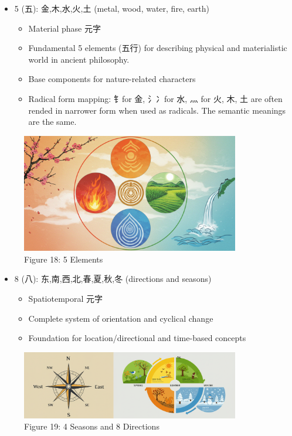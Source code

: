 \documentclass[
  11pt,
  letterpaper,
]{article}
\providecommand{\tightlist}{%
  \setlength{\itemsep}{0pt}\setlength{\parskip}{0pt}}
\begin{document}
\begin{itemize}
\tightlist
\item
  5 (五): 金,木,水,火,土 (metal, wood, water, fire, earth)

  \begin{itemize}
  \tightlist
  \item
    Material phase 元字
  \item
    Fundamental 5 elements (五行) for describing physical and
    materialistic world in ancient philosophy.
  \item
    Base components for nature-related characters
  \item
    Radical form mapping: 钅for 金, 氵冫for 水, 灬 for 火, 木, 土 are
    often rended in narrower form when used as radicals. The semantic
    meanings are the same.
  \end{itemize}
\end{itemize}

\begin{figure}
\centering
\includegraphics[width=0.85\textwidth]{./images/five-elements.jpg}
\caption{Figure 18: 5 Elements}
\end{figure}

\begin{itemize}
\tightlist
\item
  8 (八): 东,南,西,北,春,夏,秋,冬 (directions and seasons)

  \begin{itemize}
  \tightlist
  \item
    Spatiotemporal 元字
  \item
    Complete system of orientation and cyclical change
  \item
    Foundation for location/directional and time-based concepts
  \end{itemize}
\end{itemize}

\begin{figure}
\centering
\includegraphics[width=0.85\textwidth]{./images/8-directions-seasons.png}
\caption{Figure 19: 4 Seasons and 8 Directions}
\end{figure}
\end{document}
